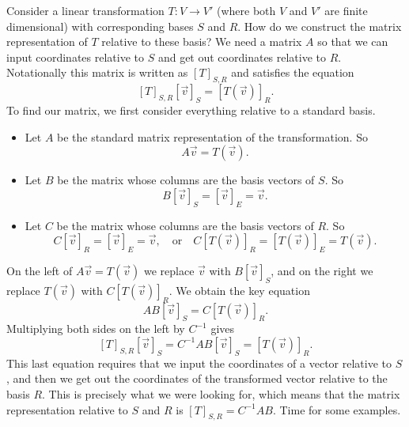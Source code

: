 Consider a linear transformation $T\colon V \to V'$ (where both $V$ and $V'$ are finite dimensional) with corresponding bases $S$ and $R$. 
How do we construct the matrix representation of $T$ relative to these basis?  
We need a matrix $A$ so that we can input coordinates relative to $S$ and get out coordinates relative to $R$.  
Notationally this matrix is written as $[T]_{S,R}$ and satisfies the equation $$[T]_{S,R}[\vec v]_S=[T(\vec v)]_{R}.$$ 
To find our matrix, we first consider everything relative to a standard basis. 
\begin{itemize}
	\item Let $A$ be the standard matrix representation of the transformation. So $$A\vec v = T(\vec v).$$
	\item Let $B$ be the matrix whose columns are the basis vectors of $S$. So $$B[\vec v]_S=[\vec v]_E=\vec v.$$
	\item Let $C$ be the matrix whose columns are the basis vectors of $R$. So $$C[\vec v]_{R}=[\vec v]_E=\vec v, \quad \text{or}\quad C[T(\vec v)]_{R}=[T(\vec v)]_E=T(\vec v).$$
\end{itemize}
On the left of $A\vec v = T(\vec v)$ we replace $\vec v$ with $B[\vec v]_S$, and on the right we replace $T(\vec v)$ with $C[T(\vec v)]_{R}$. We obtain the key equation 
$$AB[\vec v]_S=C[T(\vec v)]_{R}.$$
Multiplying both sides on the left by $C^{-1}$ gives $$[T]_{S,R}[\vec v]_S=C^{-1}AB[\vec v]_S=[T(\vec v)]_{R}.$$ This last equation requires that we input the coordinates of a vector relative to $S$, and then we get out the coordinates of the transformed vector relative to the basis $R$. This is precisely what we were looking for, which means that the matrix representation relative to $S$ and $R$ is $[T]_{S,R} = C^{-1}AB$. Time for some examples.





